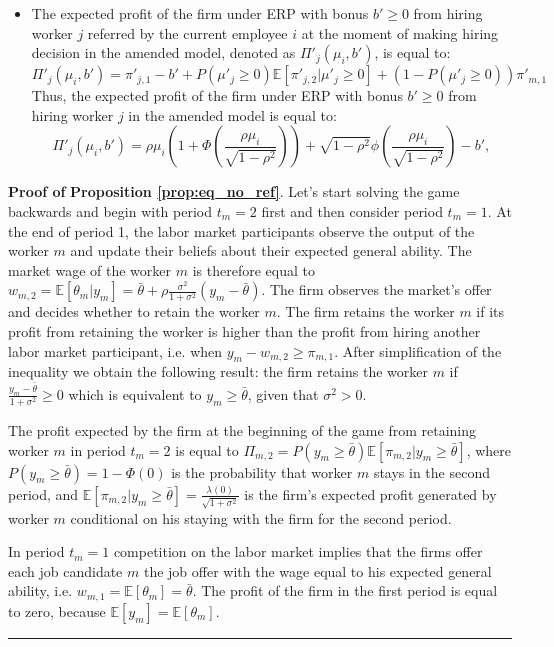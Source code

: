 \documentclass[12pt]{article}
\newenvironment{proof}[1][Proof of]{\noindent\textbf{#1} }{\ \rule{0.5em}{0.5em}}
\begin{document}
\begin{itemize}
    \item The expected profit of the firm under ERP with bonus $b' \geq 0$ from hiring worker $j$ referred by the current employee $i$ at the moment of making hiring decision in the amended model, denoted as $\Pi'_j(\mu_i, b')$, is equal to:
    \begin{equation*}
        \Pi'_j(\mu_i, b') = \pi'_{j,1} - b' + P\left( \mu'_j \geq 0 \right) \mathbb {E}[\pi'_{j,2} | \mu'_j \geq 0] 
        + (1 - P\left( \mu'_j \geq 0 \right)) \pi'_{m,1}
    \end{equation*}
    Thus, the expected profit of the firm under ERP with bonus $b' \geq 0$ from hiring worker $j$ in the amended model is equal to:
    \begin{equation}\label{eq_ext_pi_j_y_i_b}
        \Pi'_j(\mu_i, b') =  \rho\mu_i \left(1+\Phi\left(\frac{\rho\mu_i}{\sqrt{1-\rho^2}}\right)\right) + \sqrt{1-\rho^2}\phi\left(\frac{\rho\mu_i}{\sqrt{1-\rho^2}}\right) - b',
    \end{equation}
\end{itemize}

\begin{proof}
    \textbf{Proposition \ref{prop:eq_no_ref}}. 
    Let's start solving the game backwards and begin with period $t_m = 2$ first and then consider period $t_m = 1$. At the end of period 1, the labor market participants observe the output of the worker $m$  and update their beliefs about their expected general ability. The market wage of the worker $m$ is therefore equal to $w_{m,2} = \mathbb{E}[\theta_m | y_m] = \bar{\theta} + \rho\frac{\sigma^2}{1+\sigma^2}(y_m - \bar{\theta})$. The firm observes the market's offer and decides whether to retain the worker $m$. The firm retains the worker $m$ if its profit from retaining the worker is higher than the profit from hiring another labor market participant, i.e. when $y_m - w_{m,2} \geq \pi_{m,1}$. After simplification of the inequality we obtain the following result: the firm retains the worker $m$ if $\frac{y_m - \bar{\theta}}{1+\sigma^2} \geq 0$ which is equivalent to $y_m \geq \bar{\theta}$, given that $\sigma^2 >0$. 
    
    The profit expected by the firm at the beginning of the game from retaining worker $m$ in period $t_m = 2$ is equal to $\Pi_{m,2} = P(y_m \geq \bar{\theta})\mathbb{E}[\pi_{m,2}|y_m \geq \bar{\theta}]$, where $P(y_m \geq \bar{\theta}) = 1-\Phi(0)$ is the probability that worker $m$ stays in the second period, and $\mathbb{E}[\pi_{m,2}|y_m \geq \bar{\theta}] = \frac{\lambda(0)}{\sqrt{1+\sigma^2}}$ is the firm's expected profit generated by worker $m$ conditional on his staying with the firm for the second period.  
    
    In period $t_m = 1$ competition on the labor market implies that the firms offer each job candidate $m$ the job offer with the wage equal to his expected general ability, i.e. $w_{m,1} = \mathbb{E}[\theta_m] = \bar{\theta}$. The profit of the firm in the first period is equal to zero, because $\mathbb{E}[y_m] = \mathbb{E}[\theta_m]$. 
\end{proof}
\end{document}
